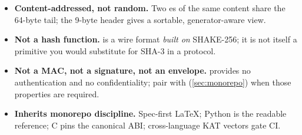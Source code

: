 \begin{calloutinfo}[At a glance]
\begin{itemize}
\item \textbf{Content-addressed, not random.} Two \pqhash{}es of the same content share the 64-byte tail; the 9-byte header gives a sortable, generator-aware view.
\item \textbf{Not a hash function.} \pqhash{} is a wire format \emph{built on} SHAKE-256; it is not itself a primitive you would substitute for SHA-3 in a protocol.
\item \textbf{Not a MAC, not a signature, not an envelope.} \pqhash{} provides no authentication and no confidentiality; pair with \pqcrypt{} (\cref{sec:monorepo}) when those properties are required.
\item \textbf{Inherits monorepo discipline.} Spec-first LaTeX; Python is the readable reference; C pins the canonical ABI; cross-language KAT vectors gate CI.
\end{itemize}
\end{calloutinfo}
